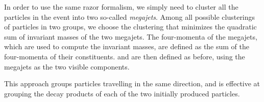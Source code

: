 In order to use the same razor formalism, we simply need to cluster all the particles in the event
into two so-called \textit{megajets}. Among all possible clusterings of particles in two groups, we
choose the clustering that minimizes the quadratic sum of invariant masses of the two megajets. The
four-momenta of the megajets, which are used to compute the invariant masses, are defined as the sum
of the four-momenta of their constituents. \mr and \rsq are then defined as before, using the
megajets as the two visible components. 

This approach groups particles travelling in the same direction, and is effective at grouping the
decay products of each of the two initially produced particles. 




